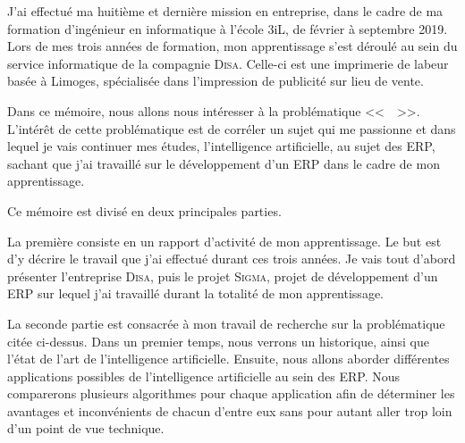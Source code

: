 
J'ai effectué ma huitième et dernière mission en entreprise, dans le cadre de ma formation d'ingénieur en informatique à l'école 3iL, de février à septembre 2019.
Lors de mes trois années de formation, mon apprentissage s'est déroulé au sein du service informatique de la compagnie \textsc{Disa}.
Celle-ci est une imprimerie de labeur basée à Limoges, spécialisée dans l'impression de publicité sur lieu de vente.

Dans ce mémoire, nous allons nous intéresser à la problématique <<~\sujet~>>.
L'intérêt de cette problématique est de corréler un sujet qui me passionne et dans lequel je vais continuer mes études, l'intelligence artificielle, au sujet des ERP, sachant que j'ai travaillé sur le développement d'un ERP dans le cadre de mon apprentissage.

Ce mémoire est divisé en deux principales parties.

La première consiste en un rapport d'activité de mon apprentissage.
Le but est d'y décrire le travail que j'ai effectué durant ces trois années.
Je vais tout d'abord présenter l'entreprise \textsc{Disa}, puis le projet \textsc{Sigma}, projet de développement d'un ERP sur lequel j'ai travaillé durant la totalité de mon apprentissage.

La seconde partie est consacrée à mon travail de recherche sur la problématique citée ci-dessus.
Dans un premier temps, nous verrons un historique, ainsi que l'état de l'art de l'intelligence artificielle.
Ensuite, nous allons aborder différentes applications possibles de l'intelligence artificielle au sein des ERP.
Nous comparerons plusieurs algorithmes pour chaque application afin de déterminer les avantages et inconvénients de chacun d'entre eux sans pour autant aller trop loin d'un point de vue technique. 
